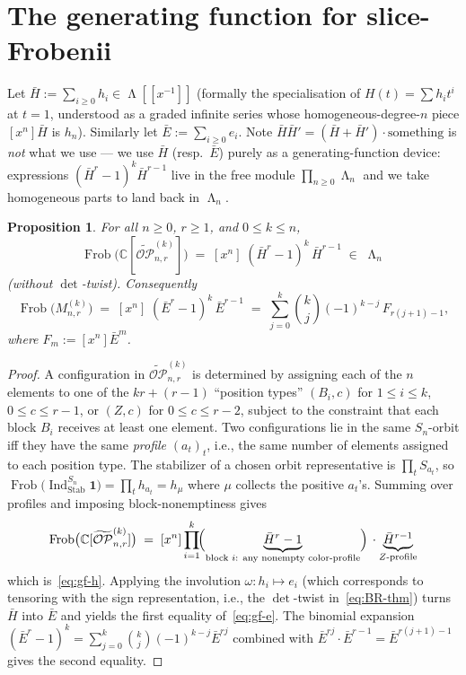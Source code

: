 \documentclass[11pt]{article}
\newtheorem{proposition}[theorem]{Proposition}
\theoremstyle{definition}
\DeclareMathOperator{\Frob}{Frob}
\DeclareMathOperator{\Lam}{\Lambda}
\DeclareMathOperator{\Ind}{Ind}
\newcommand{\OPt}{\widetilde{\mathcal{OP}}}
\newcommand{\bE}{\bar{E}}
\newcommand{\bH}{\bar{H}}
\newcommand{\CC}{\mathbb{C}}
\begin{document}
\section{The generating function for slice-Frobenii}

Let $\bH:=\sum_{i\ge 0}h_i\in\Lam[[\!x^{-1}\!]]$ (formally the specialisation
of $H(t)=\sum h_it^i$ at $t=1$, understood as a graded infinite series
whose homogeneous-degree-$n$ piece $[x^n]\bH$ is $h_n$). Similarly let
$\bE:=\sum_{i\ge 0}e_i$. Note $\bH\bH'=(\bH+\bH')\cdot\text{something}$ is
\emph{not} what we use --- we use $\bH$ (resp.\ $\bE$) purely as a
generating-function device: expressions $(\bH^r-1)^k\bH^{r-1}$ live in the
free module $\prod_{n\ge 0}\Lam_n$ and we take homogeneous parts to land
back in $\Lam_n$.

\begin{proposition}\label{prop:gf}
For all $n\ge 0$, $r\ge 1$, and $0\le k\le n$,
\begin{equation}\label{eq:gf-h}
   \Frob\bigl(\CC[\OPt_{n,r}^{(k)}]\bigr)
   \;=\;[x^n]\;(\bH^r-1)^k\,\bH^{r-1}
   \;\in\;\Lam_n
\end{equation}
(without $\det$-twist). Consequently
\begin{equation}\label{eq:gf-e}
   \Frob\bigl(M_{n,r}^{(k)}\bigr)
   \;=\;[x^n]\;(\bE^r-1)^k\,\bE^{r-1}
   \;=\;\sum_{j=0}^k\binom{k}{j}(-1)^{k-j}\,F_{r(j+1)-1},
\end{equation}
where $F_m:=[x^n]\bE^m$.
\end{proposition}

\begin{proof}
A configuration in $\OPt_{n,r}^{(k)}$ is determined by assigning each of the
$n$ elements to one of the $kr+(r-1)$ ``position types''
$(B_i,c)$ for $1\le i\le k$, $0\le c\le r-1$, or $(Z,c)$ for $0\le c\le r-2$,
subject to the constraint that each block $B_i$ receives at least one
element. Two configurations lie in the same $S_n$-orbit iff they have the
same \emph{profile} $(a_t)_t$, i.e., the same number of elements assigned to
each position type. The stabilizer of a chosen orbit representative is
$\prod_t S_{a_t}$, so
$\Frob\bigl(\Ind_{\mathrm{Stab}}^{S_n}\mathbf{1}\bigr)=\prod_t h_{a_t}=h_\mu$
where $\mu$ collects the positive $a_t$'s. Summing over profiles and
imposing block-nonemptiness gives
\begin{align*}
   \Frob\bigl(\CC[\OPt_{n,r}^{(k)}]\bigr)
   \;=\;[x^n]\prod_{i=1}^{k}\!\Bigl(\underbrace{\bH^r-1}_{\text{block $i$: any nonempty color-profile}}\Bigr)\,
                  \cdot\underbrace{\bH^{r-1}}_{Z\text{-profile}}
\end{align*}
which is~\eqref{eq:gf-h}. Applying the involution
$\omega\colon h_i\mapsto e_i$ (which corresponds to tensoring with the sign
representation, i.e., the $\det$-twist in~\eqref{eq:BR-thm}) turns $\bH$ into
$\bE$ and yields the first equality of~\eqref{eq:gf-e}. The binomial
expansion $(\bE^r-1)^k=\sum_{j=0}^k\binom{k}{j}(-1)^{k-j}\bE^{rj}$
combined with $\bE^{rj}\cdot\bE^{r-1}=\bE^{r(j+1)-1}$ gives the second
equality.
\end{proof}
\end{document}

